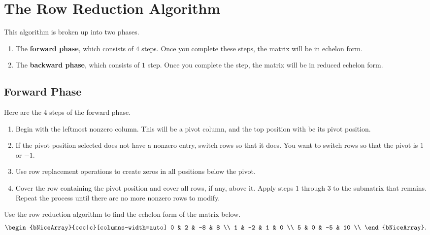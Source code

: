
\section{The Row Reduction Algorithm}
\label{sec:the_row_reduction_algorithm}

This algorithm is broken up into two phases.
\begin{enumerate}
  \label{enum:row_reduction_algorithm_phases}

  \item The \textbf{forward phase}, which consists of $4$ steps. Once you
    complete these steps, the matrix will be in echelon form.

  \item The \textbf{backward phase}, which consists of $1$ step. Once you
    complete the step, the matrix will be in reduced echelon form.
\end{enumerate}

\subsection{Forward Phase}
\label{sub_sec:forward_phase}

Here are the $4$ steps of the forward phase.
\begin{enumerate}
  \label{enum:forward_phase_steps}

  \item Begin with the leftmost nonzero column. This will be a pivot column, and
    the top position with be its pivot position.

  \item If the pivot position selected does not have a nonzero entry, switch
    rows so that it does. You want to switch rows so that the pivot is $1$ or
    $-1$.

  \item Use row replacement operations to create zeros in all positions below
    the pivot.

  \item Cover the row containing the pivot position and cover all rows, if any,
    above it. Apply steps $1$ through $3$ to the submatrix that remains. Repeat
    the process until there are no more nonzero rows to modify.
\end{enumerate}

\begin{question}
  \label{qst:forward_phase}

  Use the row reduction algorithm to find the echelon form of the matrix below.
  \[%
    \begin{bNiceArray}{ccc|c}[columns-width=auto]
      0 & 2 & -8 & 8 \\
      1 & -2 & 1 & 0 \\
      5 & 0 & -5 & 10 \\
    \end{bNiceArray}
  .\]%
\end{question}

